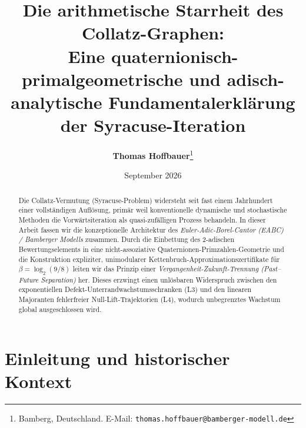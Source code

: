 \documentclass[11pt,a4paper]{article}
\title{\textbf{Die arithmetische Starrheit des Collatz-Graphen:}\\[0.5em]
	\Large Eine quaternionisch-primalgeometrische und adisch-analytische Fundamentalerklärung der Syracuse-Iteration}
\author{\textbf{Thomas Hoffbauer}\thanks{Bamberg, Deutschland. E-Mail: \texttt{thomas.hoffbauer@bamberger-modell.de}}}
\date{September 2026}
\theoremstyle{definition}
\begin{document}
	
	\maketitle
	
	\begin{abstract}
		Die Collatz-Vermutung (Syracuse-Problem) widersteht seit fast einem Jahrhundert einer vollständigen Auflösung, primär weil konventionelle dynamische und stochastische Methoden die Vorwärtsiteration als quasi-zufälligen Prozess behandeln. In dieser Arbeit fassen wir die konzeptionelle Architektur des \emph{Euler-Adic-Borel-Cantor (EABC) / Bamberger Modells} zusammen. Durch die Einbettung des 2-adischen Bewertungselements in eine nicht-assoziative Quaternionen-Primzahlen-Geometrie und die Konstruktion expliziter, unimodularer Kettenbruch-Approximationszertifikate für $\beta = \log_2(9/8)$ leiten wir das Prinzip einer \emph{Vergangenheit-Zukunft-Trennung (Past--Future Separation)} her. Dieses erzwingt einen unlösbaren Widerspruch zwischen den exponentiellen Defekt-Unterrandwachstumsschranken (L3) und den linearen Majoranten fehlerfreier Null-Lift-Trajektorien (L4), wodurch unbegrenztes Wachstum global ausgeschlossen wird.
	\end{abstract}
	
	\tableofcontents %
	\newpage
	
	\section{Einleitung und historischer Kontext}
	
\end{document}
